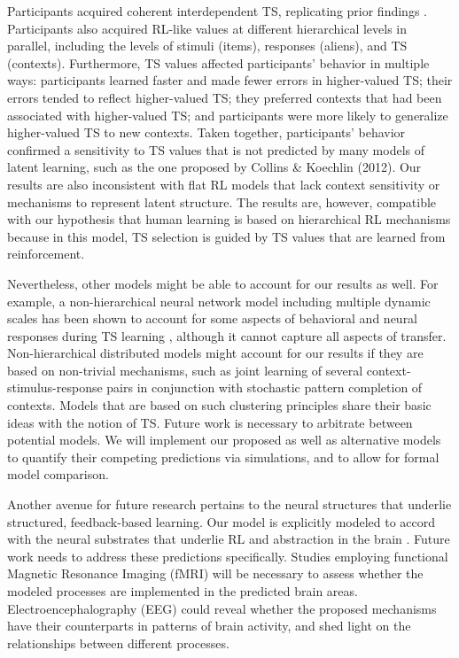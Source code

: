 \documentclass[10pt, letterpaper]{article}
\begin{document}
Participants acquired coherent interdependent TS, replicating prior findings \cite{collins_reasoning_2012, collins_cognitive_2013}. Participants also acquired RL-like values at different hierarchical levels in parallel, including the levels of stimuli (items), responses (aliens), and TS (contexts). Furthermore, TS values affected participants' behavior in multiple ways: participants learned faster and made fewer errors in higher-valued TS; their errors tended to reflect higher-valued TS; they preferred contexts that had been associated with higher-valued TS; and participants were more likely to generalize higher-valued TS to new contexts. Taken together, participants' behavior confirmed a sensitivity to TS values that is not predicted by many models of latent learning, such as the one proposed by Collins \& Koechlin (2012). Our results are also inconsistent with flat RL models that lack context sensitivity or mechanisms to represent latent structure. The results are, however, compatible with our hypothesis that human learning is based on hierarchical RL mechanisms because in this model, TS selection is guided by TS values that are learned from reinforcement.


Nevertheless, other models might be able to account for our results as well. For example, a non-hierarchical neural network model including multiple dynamic scales has been shown to account for some aspects of behavioral and neural responses during TS learning \cite{bouchacourt_hebbian_2016}, although it cannot capture all aspects of transfer. Non-hierarchical distributed models might account for our results if they are based on non-trivial mechanisms, such as joint learning of several context-stimulus-response pairs in conjunction with stochastic pattern completion of contexts. Models that are based on such clustering principles share their basic ideas with the notion of TS. Future work is necessary to arbitrate between potential models. We will implement our proposed as well as alternative models to quantify their competing predictions via simulations, and to allow for formal model comparison.

Another avenue for future research pertains to the neural structures that underlie structured, feedback-based learning. Our model is explicitly modeled to accord with the neural substrates that underlie RL and abstraction in the brain \cite{alexander_parallel_1986}. Future work needs to address these predictions specifically. Studies employing functional Magnetic Resonance Imaging (fMRI) will be necessary to assess whether the modeled processes are implemented in the predicted brain areas. Electroencephalography (EEG) could reveal whether the proposed mechanisms have their counterparts in patterns of brain activity, and shed light on the relationships between different processes. 
\end{document}
